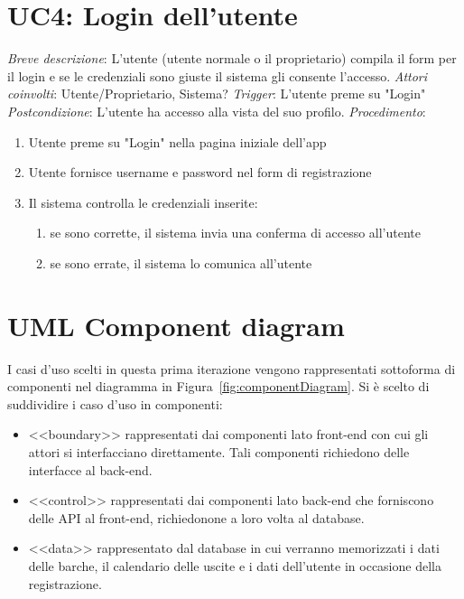 \section{UC4: Login dell'utente}
\noindent \emph{Breve descrizione}: L'utente (utente normale o il proprietario) compila il form per il login e se le credenziali sono giuste il sistema gli consente l'accesso.\medbreak
\noindent \emph{Attori coinvolti}: Utente/Proprietario, Sistema?\medbreak
\noindent \emph{Trigger}: L'utente preme su "Login"\medbreak
\noindent \emph{Postcondizione}: L'utente ha accesso alla vista del suo profilo.\medbreak
\noindent \emph{Procedimento}:
\begin{enumerate}
    \item Utente preme su "Login" nella pagina iniziale dell'app
    \item Utente fornisce username e password nel form di registrazione
    \item Il sistema controlla le credenziali inserite:
          \begin{enumerate}
              \item se sono corrette, il sistema invia una conferma di accesso all'utente
              \item se sono errate, il sistema lo comunica all'utente
          \end{enumerate}
\end{enumerate}

\section{UML Component diagram}
I casi d'uso scelti in questa prima iterazione vengono rappresentati sottoforma di componenti nel diagramma in Figura~\ref{fig:componentDiagram}.
Si è scelto di suddividire i caso d'uso in componenti:

\begin{itemize}
    \item <<boundary>> rappresentati dai componenti lato front-end con cui gli attori si interfacciano direttamente. Tali componenti richiedono delle interfacce al back-end.
    \item <<control>> rappresentati dai componenti lato back-end che forniscono delle API al front-end, richiedonone a loro volta al database.
    \item <<data>> rappresentato dal database in cui verranno memorizzati i dati delle barche, il calendario delle uscite e i dati dell'utente in occasione della registrazione.
\end{itemize}

